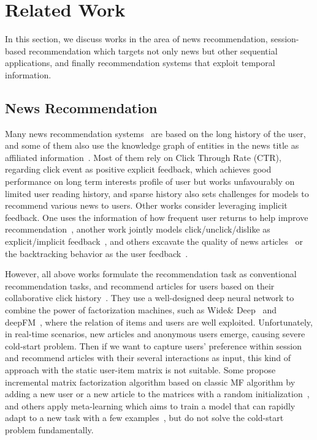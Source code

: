 \section{Related Work}
In this section, we discuss works in the area of news recommendation, session-based
recommendation which targets not only news but other sequential applications, and
finally recommendation systems that exploit temporal information.

\subsection{News Recommendation}
Many news recommendation systems~\cite{wu_neural_2019-1,wu2019npa} are based on the long history of the user, and some of them also use the knowledge graph of entities in the news title as affiliated information~\cite{wang2018dkn, wang_ripplenet:_2018}. Most of them rely on Click Through Rate (CTR), regarding click event as positive explicit feedback, which achieves good performance on long term interests profile of user but works unfavourably on limited user reading history, and sparse history also sets challenges for models to recommend various news to users. Other works consider leveraging implicit feedback. One uses the information of how frequent user returns to help improve recommendation~\cite{zheng2018drn}, another work jointly models click/unclick/dislike as explicit/implicit feedback~\cite{xie2020deep}, and others excavate the quality of news articles~\cite{lu_quality_2019} or the backtracking behavior as the user feedback~\cite{smadja_understanding_2019}. 

However, all above works formulate the recommendation task as conventional recommendation tasks, and recommend articles for users based on their collaborative click history~\cite{zhu2019dan}. They use a well-designed deep neural network to combine the power of factorization machines, such as Wide\& Deep~\cite{cheng2016wide} and deepFM~\cite{guodeepfm2017}, where the relation of items and users are well exploited. Unfortunately, in real-time scenarios, new articles and anonymous users emerge, causing severe cold-start problem. Then if we want to capture users' preference within session and recommend articles with their several interactions as input, this kind of approach with the static user-item matrix is not suitable. Some propose incremental matrix factorization algorithm based on classic MF algorithm by adding a new user or a new article to the matrices with a random initialization~\cite{al2018adaptive}, and others apply meta-learning which aims to train a model that can rapidly adapt to a new task with a few examples~\cite{lee_melu:_2019}, but do not solve the cold-start problem fundamentally.
